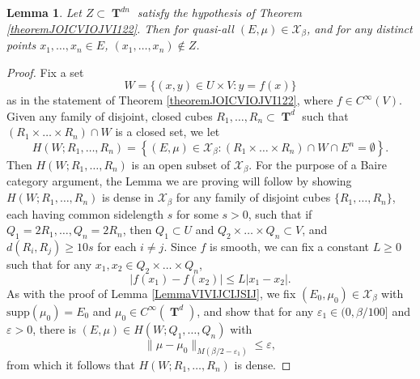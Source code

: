 \documentclass[12pt,reqno]{article}
\numberwithin{equation}{section}
\DeclareMathOperator{\TT}{\mathbf{T}}
\newtheorem{lemma}[theorem]{Lemma}
\numberwithin{theorem}{section}
\begin{document}
\begin{lemma} \label{lemmaOIOICJOIJOISJOIJS}
    Let $Z \subset \TT^{dn}$ satisfy the hypothesis of Theorem \ref{theoremJOICVIOJVI122}. Then for quasi-all $(E,\mu) \in \mathcal{X}_\beta$, and for any distinct points $x_1,\dots,x_n \in E$, $(x_1,\dots,x_n) \not \in Z$.
\end{lemma}
\begin{proof}
    Fix a set
    \[ W = \{ (x,y) \in U \times V : y = f(x) \} \]
    as in the statement of Theorem \ref{theoremJOICVIOJVI122}, where $f \in C^\infty(V)$. Given any family of disjoint, closed cubes $R_1,\dots,R_n \subset \TT^d$ such that $(R_1 \times \dots \times R_n) \cap W$ is a closed set, we let
    \begin{equation}
        H(W;R_1,\dots,R_n) = \left\{ (E,\mu) \in \mathcal{X}_\beta: (R_1 \times \dots \times R_n) \cap W \cap E^n = \emptyset \right\}.
    \end{equation}
    Then $H(W;R_1,\dots,R_n)$ is an open subset of $\mathcal{X}_\beta$. For the purpose of a Baire category argument, the Lemma we are proving will follow by showing $H(W;R_1,\dots,R_n)$ is dense in $\mathcal{X}_\beta$ for any family of disjoint cubes $\{ R_1,\dots, R_n \}$, each having common sidelength $s$ for some $s > 0$, such that if $Q_1 = 2R_1,\dots,Q_n = 2R_n$, then $Q_1 \subset U$ and $Q_2 \times \dots \times Q_n \subset V$, and $d(R_i,R_j) \geq 10s$ for each $i \neq j$. Since $f$ is smooth, we can fix a constant $L \geq 0$ such that for any $x_1,x_2 \in Q_2 \times \dots \times Q_n$,
    \[ |f(x_1) - f(x_2)| \leq L|x_1 - x_2|. \]
    As with the proof of Lemma \ref{LemmaVIVIJCIJSIJ}, we fix $(E_0,\mu_0) \in \mathcal{X}_\beta$ with $\text{supp}(\mu_0) = E_0$ and $\mu_0 \in C^\infty(\TT^d)$, and show that for any $\varepsilon_1 \in (0,\beta/100]$ and $\varepsilon > 0$, there is $(E,\mu) \in H(W;Q_1,\dots,Q_n)$ with
    \begin{equation}
        \| \mu - \mu_0 \|_{M(\beta/2-\varepsilon_1)} \leq \varepsilon,
    \end{equation}
    from which it follows that $H(W;R_1,\dots,R_n)$ is dense.


\end{proof}
\end{document}
